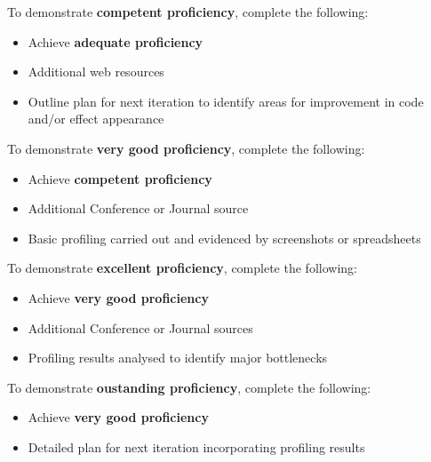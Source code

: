 \documentclass{../../../fal_assignment}
\begin{document}
To demonstrate \textbf{competent proficiency}, complete the following:
\begin{itemize}
	\item Achieve \textbf{adequate proficiency}
	\item Additional web resources
	\item Outline plan for next iteration to identify areas for improvement in code and/or effect appearance
\end{itemize}

To demonstrate \textbf{very good proficiency}, complete the following:
\begin{itemize}
	\item Achieve \textbf{competent proficiency}
	\item Additional Conference or Journal source
	\item Basic profiling carried out and evidenced by screenshots or spreadsheets
\end{itemize}

To demonstrate \textbf{excellent proficiency}, complete the following:
\begin{itemize}
	\item Achieve \textbf{very good proficiency}
	\item Additional Conference or Journal sources
	\item Profiling results analysed to identify major bottlenecks
\end{itemize}

To demonstrate \textbf{oustanding proficiency}, complete the following:
\begin{itemize}
	\item Achieve \textbf{very good proficiency}
	\item Detailed plan for next iteration incorporating profiling results
\end{itemize}
\end{document}
